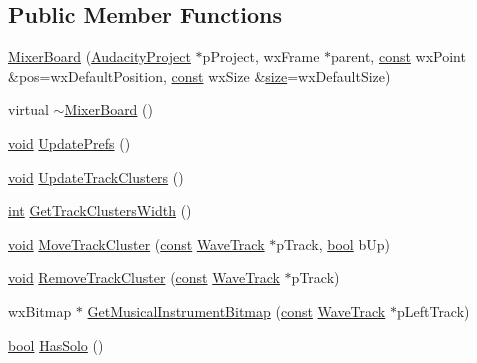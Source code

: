 \subsection*{Public Member Functions}
\begin{DoxyCompactItemize}
\item 
\hyperlink{class_mixer_board_aa28f54981ae36fd355d46cc56ee423e2}{Mixer\+Board} (\hyperlink{class_audacity_project}{Audacity\+Project} $\ast$p\+Project, wx\+Frame $\ast$parent, \hyperlink{getopt1_8c_a2c212835823e3c54a8ab6d95c652660e}{const} wx\+Point \&pos=wx\+Default\+Position, \hyperlink{getopt1_8c_a2c212835823e3c54a8ab6d95c652660e}{const} wx\+Size \&\hyperlink{group__lavu__mem_ga854352f53b148adc24983a58a1866d66}{size}=wx\+Default\+Size)
\item 
virtual \hyperlink{class_mixer_board_ac7a1eb4a789ad10234d293c2212bd885}{$\sim$\+Mixer\+Board} ()
\item 
\hyperlink{sound_8c_ae35f5844602719cf66324f4de2a658b3}{void} \hyperlink{class_mixer_board_ae44f2d9650c4d7256bc63a20f83affd2}{Update\+Prefs} ()
\item 
\hyperlink{sound_8c_ae35f5844602719cf66324f4de2a658b3}{void} \hyperlink{class_mixer_board_a84e9f17f3cfb9618fd70931fa6543aac}{Update\+Track\+Clusters} ()
\item 
\hyperlink{xmltok_8h_a5a0d4a5641ce434f1d23533f2b2e6653}{int} \hyperlink{class_mixer_board_ab692bfed91d635ac20de6771c59e696c}{Get\+Track\+Clusters\+Width} ()
\item 
\hyperlink{sound_8c_ae35f5844602719cf66324f4de2a658b3}{void} \hyperlink{class_mixer_board_ac1f50e2c959930a996d1db07fb2795fb}{Move\+Track\+Cluster} (\hyperlink{getopt1_8c_a2c212835823e3c54a8ab6d95c652660e}{const} \hyperlink{class_wave_track}{Wave\+Track} $\ast$p\+Track, \hyperlink{mac_2config_2i386_2lib-src_2libsoxr_2soxr-config_8h_abb452686968e48b67397da5f97445f5b}{bool} b\+Up)
\item 
\hyperlink{sound_8c_ae35f5844602719cf66324f4de2a658b3}{void} \hyperlink{class_mixer_board_aeb48716b9845f75acadffea0682c8bb8}{Remove\+Track\+Cluster} (\hyperlink{getopt1_8c_a2c212835823e3c54a8ab6d95c652660e}{const} \hyperlink{class_wave_track}{Wave\+Track} $\ast$p\+Track)
\item 
wx\+Bitmap $\ast$ \hyperlink{class_mixer_board_a0f9baae7831c0001722a1a7adb8eaef1}{Get\+Musical\+Instrument\+Bitmap} (\hyperlink{getopt1_8c_a2c212835823e3c54a8ab6d95c652660e}{const} \hyperlink{class_wave_track}{Wave\+Track} $\ast$p\+Left\+Track)
\item 
\hyperlink{mac_2config_2i386_2lib-src_2libsoxr_2soxr-config_8h_abb452686968e48b67397da5f97445f5b}{bool} \hyperlink{class_mixer_board_a86a3404334dd4ff3f2f7d117359abac7}{Has\+Solo} ()

\end{DoxyCompactItemize}
